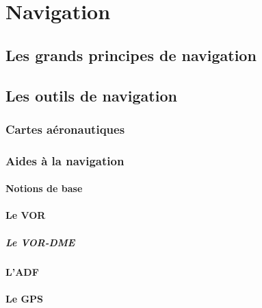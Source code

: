 \section{Navigation}
	\subsection{Les grands principes de navigation}
	
	\subsection{Les outils de navigation}
		\subsubsection{Cartes aéronautiques}
		
		\subsubsection{Aides à la navigation}
			\paragraph{Notions de base}
			
			\paragraph{Le VOR}
			
			\subparagraph{Le VOR-DME}
			
			\paragraph{L'ADF}
			
			\paragraph{Le GPS}